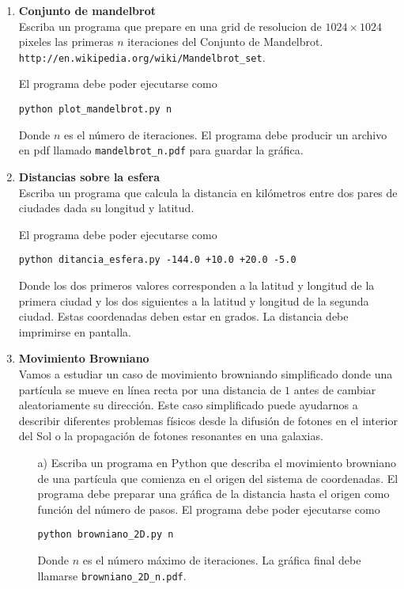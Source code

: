 \documentclass{article}
\begin{document}
\begin{enumerate}
\item
{\bf Conjunto de mandelbrot}\\

Escriba un programa que prepare en una grid de resolucion de
$1024\times 1024$ pixeles las primeras $n$ iteraciones del
Conjunto de
Mandelbrot. \verb"http://en.wikipedia.org/wiki/Mandelbrot_set". 

El programa debe poder ejecutarse como

\begin{verbatim}
python plot_mandelbrot.py n
\end{verbatim}
Donde $n$ es el n\'umero de iteraciones. El programa debe producir un
archivo en pdf llamado \verb"mandelbrot_n.pdf" para guardar la
gr\'afica. 

\item 
{\bf Distancias sobre la esfera}\\
Escriba un programa que calcula la distancia en kil\'ometros entre dos pares de
ciudades dada su longitud y latitud.

El programa debe poder ejecutarse como
\begin{verbatim}
python ditancia_esfera.py -144.0 +10.0 +20.0 -5.0
\end{verbatim}

Donde los dos primeros valores corresponden a la latitud y longitud de
la primera ciudad y los dos siguientes a la latitud y
longitud de la segunda ciudad. Estas coordenadas deben estar en
grados. La distancia debe imprimirse en pantalla.

\item
{\bf Movimiento Browniano}\\

Vamos a estudiar un caso de movimiento browniando simplificado donde
una part\'icula se mueve en l\'inea recta por una distancia de $1$
antes de cambiar aleatoriamente su direcci\'on. Este caso simplificado
puede ayudarnos a describir diferentes problemas f\'isicos desde la
difusi\'on de fotones en el interior del Sol o la propagaci\'on de
fotones resonantes en una galaxias.

\begin{itemize}
\item[a)] Escriba un programa en Python que describa el movimiento
  browniano de una part\'icula que comienza en el origen del sistema
  de coordenadas. El programa debe preparar una gr\'afica de la distancia
  hasta el origen como funci\'on del n\'umero de pasos. 
El programa debe poder ejecutarse como
\begin{verbatim}
python browniano_2D.py n
\end{verbatim}
Donde $n$ es el n\'umero m\'aximo de iteraciones. La gr\'afica final
debe llamarse \verb"browniano_2D_n.pdf".


\end{itemize}
\end{enumerate}
\end{document}
